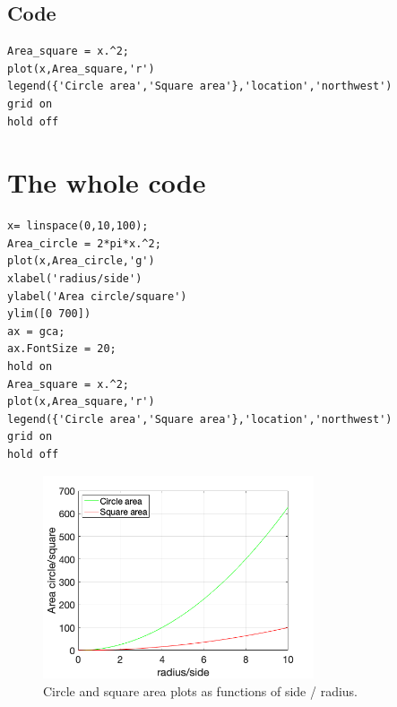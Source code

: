 \documentclass{article}
\begin{document}
\subsection{Code}
\begin{tcolorbox}
\begin{verbatim}
Area_square = x.^2;
plot(x,Area_square,'r')
legend({'Circle area','Square area'},'location','northwest')
grid on 
hold off
\end{verbatim}
\end{tcolorbox} 


\section{The whole code}
\begin{tcolorbox}
\begin{verbatim}
x= linspace(0,10,100);
Area_circle = 2*pi*x.^2;
plot(x,Area_circle,'g')
xlabel('radius/side')
ylabel('Area circle/square')
ylim([0 700])
ax = gca;
ax.FontSize = 20;
hold on
Area_square = x.^2;
plot(x,Area_square,'r')
legend({'Circle area','Square area'},'location','northwest')
grid on 
hold off
\end{verbatim}
\end{tcolorbox} 


\begin{figure}[h!]
\centering
\includegraphics[angle=0,width=8cm]{lab0 _figure2.png}
\caption{Circle and square area plots as functions of side / radius.}
\label{fig:circleAndSquareArea}
\end{figure}
\end{document}
